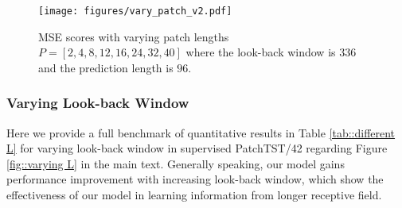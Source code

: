 \documentclass{article} \usepackage{iclr2023_conference,times}
\begin{document}
\begin{figure}[!htbp]
\begin{center}
\texttt{[image: figures/vary\_patch\_v2.pdf]}
\end{center}
\caption{MSE scores with varying patch lengths $P = [2,4,8,12,16,24,32,40]$ where the look-back window is $336$ and the prediction length is $96$.}
\label{fig::varying patch len}
\end{figure}


\subsubsection{Varying Look-back Window}

Here we provide a full benchmark of quantitative results in Table \ref{tab::different L} for varying look-back window in supervised PatchTST/42 regarding Figure \ref{fig::varying L} in the main text. Generally speaking, our model gains performance improvement with increasing look-back window, which show the effectiveness of our model in learning information from longer receptive field.
\end{document}
